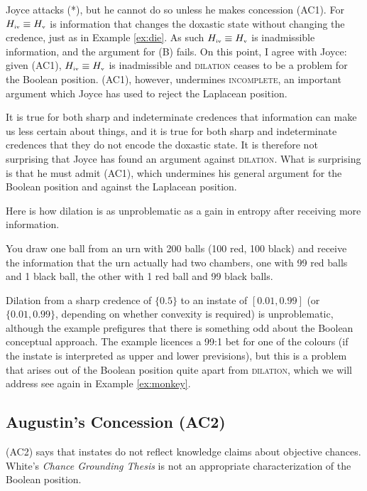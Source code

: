 \documentclass[11pt]{article}
\begin{document}
Joyce attacks (*), but he cannot do so unless he makes concession
(AC1). For $H_{\mbox{\tiny{iv}}}\equiv{}H_{\mbox{\tiny{v}}}$ is
information that changes the doxastic state without changing the
credence, just as in Example \ref{ex:die}. As such
$H_{\mbox{\tiny{iv}}}\equiv{}H_{\mbox{\tiny{v}}}$ is inadmissible
information, and the argument for (B) fails. On this point, I
agree with Joyce: given (AC1),
$H_{\mbox{\tiny{iv}}}\equiv{}H_{\mbox{\tiny{v}}}$ is inadmissible and
\textsc{dilation} ceases to be a problem for the Boolean position.
(AC1), however, undermines \textsc{incomplete}, an important argument
which Joyce has used to reject the Laplacean position.

It is true for both sharp and indeterminate credences that information
can make us less certain about things, and it is true for both sharp
and indeterminate credences that they do not encode the doxastic
state. It is therefore not surprising that Joyce has found an argument
against \textsc{dilation}. What is surprising is that he must admit
(AC1), which undermines his general argument for the Boolean position
and against the Laplacean position.

Here is how dilation is as unproblematic as a gain in entropy after
receiving more information.

\begin{quotex}
  \label{ex:urns} You draw one ball from an
  urn with 200 balls (100 red, 100 black) and receive the information
  that the urn actually had two chambers, one with 99 red balls and 1
  black ball, the other with 1 red ball and 99 black balls.
\end{quotex}

Dilation from a sharp credence of $\{0.5\}$ to an instate of
$[0.01,0.99]$ (or $\{0.01,0.99\}$, depending on whether convexity is
required) is unproblematic, although the example prefigures that there
is something odd about the Boolean conceptual approach. The example
licences a 99:1 bet for one of the colours (if the instate is
interpreted as upper and lower previsions), but this is a problem that
arises out of the Boolean position quite apart from \textsc{dilation},
which we will address see again in Example \ref{ex:monkey}.

\subsection{Augustin's Concession (AC2)}
\label{jj2}

(AC2) says that instates do not reflect knowledge claims about
objective chances. White's \emph{Chance Grounding Thesis} is not an
appropriate characterization of the Boolean position.
\end{document}
